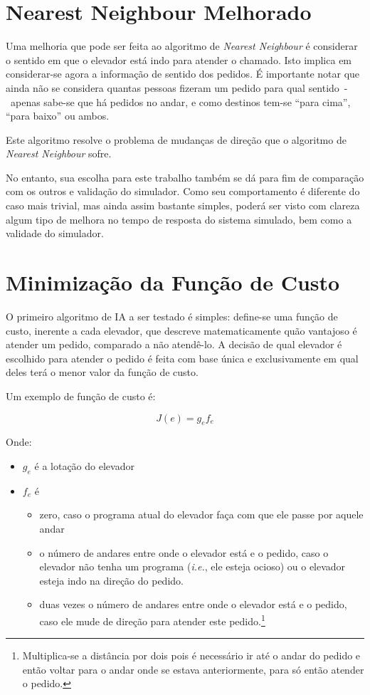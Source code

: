 \section{\label{sec:ai:nnm}Nearest Neighbour Melhorado}

Uma melhoria que pode ser feita ao algoritmo de \textit{Nearest Neighbour}
é considerar o sentido em que o elevador está indo para atender o chamado. Isto
implica em considerar-se agora a informação de sentido dos pedidos. É importante
notar que ainda não se considera quantas pessoas fizeram um pedido para qual
sentido~-~apenas sabe-se que há pedidos no andar, e como destinos tem-se ``para
cima'', ``para baixo'' ou ambos.

Este algoritmo resolve o problema de mudanças de direção que o algoritmo de
\textit{Nearest Neighbour} sofre.

No entanto, sua escolha para este trabalho também se dá para fim de comparação
com os outros e validação do simulador. Como seu comportamento é diferente do
caso mais trivial, mas ainda assim bastante simples, poderá ser visto com clareza
algum tipo de melhora no tempo de resposta do sistema simulado, bem como a validade do simulador.

\section{\label{sec:ai:minimize-cost-function}Minimização da Função de Custo}

O primeiro algoritmo de IA a ser testado é simples: define-se uma
função de custo, inerente a cada elevador, que descreve matematicamente quão
vantajoso é atender um pedido, comparado a não atendê-lo. A decisão de qual
elevador é escolhido para atender o pedido é feita com base única e
 exclusivamente em qual deles terá o menor valor da função de custo.

Um exemplo de função de custo é:

\[
  J(e) = g_{e}f_{e}
\]

Onde:
\begin{itemize}
\item \textbf{$g_{e}$} é a lotação do elevador
\item \textbf{$f_{e}$} é
  \begin{itemize}
    \item zero, caso o programa atual do elevador faça com que ele passe por
      aquele andar
    \item o número de andares entre onde o elevador está e o pedido, caso o
      elevador não tenha um programa (\textit{i.e.}, ele esteja ocioso) ou o
      elevador esteja indo na direção do pedido.
    \item duas vezes o número de andares entre onde o elevador está e o pedido,
      caso ele mude de direção para atender este pedido.\footnote{Multiplica-se
        a distância por dois pois é necessário ir até o andar do pedido e então
        voltar para o andar onde se estava anteriormente, para só então atender
        o pedido.}
  \end{itemize}
\end{itemize}

